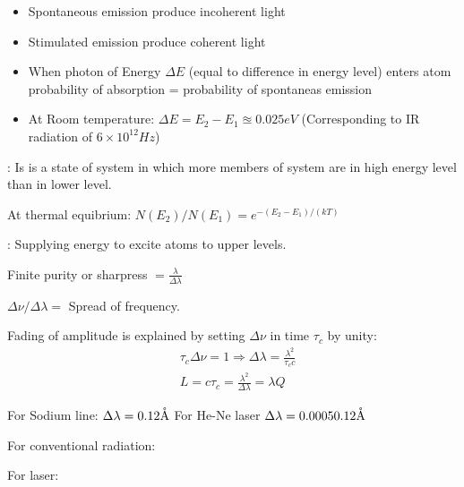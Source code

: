 \documentclass[12pt, a4paper]{article}
\begin{document}
\begin{itemize}
	\item Spontaneous emission produce incoherent light
	\item Stimulated emission produce coherent light
\end{itemize}

\begin{itemize}
	\item When photon of Energy $\Delta E$ (equal to difference in energy level) enters atom\\
	      probability of absorption = probability of spontaneas emission
	\item At Room temperature: $\Delta E = E_2-E_1 \approxeq 0.025 \unit{eV}$ (Corresponding to IR radiation of $6 \times 10^{12} \unit{Hz}$)
\end{itemize}

: Is is a state of system in which more members of system are in high energy level than in lower level.

At thermal equibrium: $N\left(E_2\right) / N\left(E_1\right)=e ^ {-\left(E_2-E_1\right) / (kT)}$

: Supplying energy to excite atoms to upper levels.


Finite purity or sharpress $=\frac{\lambda}{\Delta \lambda}$

$\Delta \nu / \Delta\lambda=$ Spread of frequency.

Fading of amplitude is explained by setting $\Delta\nu$ in time $\tau_c$ by unity:
$$
	\begin{aligned}
		 & \tau_c \Delta \nu=1 \Rightarrow \Delta \lambda=\frac{\lambda^2}{\tau_c c} \\
		 & L=c \tau_c=\frac{\lambda^2}{\Delta \lambda}= \lambda Q
	\end{aligned}
$$

For Sodium line: $\Delta \lambda = 0.12\mathring{\textrm{A}}$
For He-Ne laser $\Delta \lambda = 0.0005 0.12\mathring{\textrm{A}}$

\bigskip

{
For conventional radiation:

For laser:
}
\end{document}
